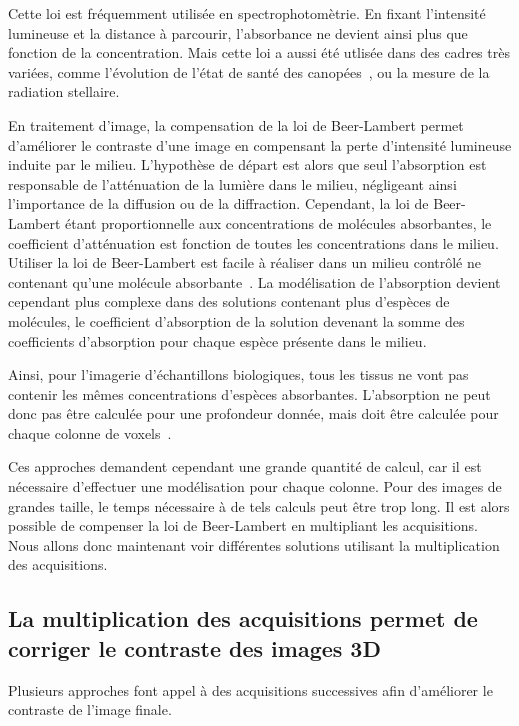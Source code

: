 \documentclass[\main/main.tex]{subfiles}
\begin{document}
%
Cette loi est fréquemment utilisée en spectrophotomètrie. En fixant l'intensité lumineuse et la distance à parcourir, l'absorbance ne devient ainsi plus que fonction de la concentration.
%
Mais cette loi a aussi été utlisée dans des cadres très variées, comme l'évolution de l'état de santé des canopées~\cite{demattos_2020, liu_2020a}, ou la mesure de la radiation stellaire.

%
En traitement d'image, la compensation de la loi de Beer-Lambert permet d'améliorer le contraste d'une image en compensant la perte d'intensité lumineuse induite par le milieu. L'hypothèse de départ est alors que seul l'absorption est responsable de l'atténuation de la lumière dans le milieu,
négligeant ainsi l'importance de la diffusion ou de la diffraction.
%
Cependant, la loi de Beer-Lambert étant proportionnelle aux concentrations de molécules absorbantes, le coefficient d'atténuation est fonction de toutes les concentrations dans le milieu.
%
Utiliser la loi de Beer-Lambert est facile à réaliser dans un milieu contrôlé ne contenant qu'une molécule absorbante~\cite{mikulewitsch_2018}. La modélisation de l'absorption devient cependant plus complexe dans des solutions contenant plus d'espèces de molécules, le coefficient d'absorption de la solution devenant la somme des coefficients d'absorption pour chaque espèce présente dans le milieu.

%
Ainsi, pour l'imagerie d'échantillons biologiques, tous les tissus ne vont pas contenir les mêmes concentrations d'espèces absorbantes. L'absorption ne peut donc pas être calculée pour une profondeur donnée, mais doit être calculée pour chaque colonne de voxels~\cite{ohser_2020,nylk_2018,parker_2020}.

%
Ces approches demandent cependant une grande quantité de calcul,
car il est nécessaire d'effectuer une modélisation pour chaque colonne. Pour des images de grandes taille, le temps nécessaire à de tels calculs peut être trop long.
%
Il est alors possible de compenser la loi de Beer-Lambert en multipliant les acquisitions.
%
Nous allons donc maintenant voir différentes solutions utilisant la multiplication des acquisitions.

\subsection{La multiplication des acquisitions permet de corriger le contraste des images 3D}

Plusieurs approches font appel à des acquisitions successives afin d'améliorer le contraste de l'image finale.
%
\end{document}
